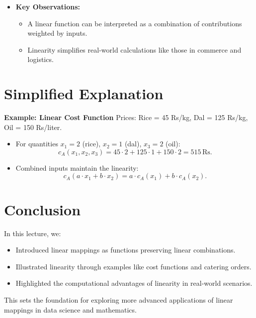 \documentclass{article}
\begin{document}
\begin{itemize}
  \item \textbf{Key Observations:}
    \begin{itemize}
      \item A linear function can be interpreted as a combination of contributions weighted by inputs.
      \item Linearity simplifies real-world calculations like those in commerce and logistics.
    \end{itemize}
\end{itemize}

\section*{Simplified Explanation}

\textbf{Example: Linear Cost Function}
Prices: Rice = 45 Rs/kg, Dal = 125 Rs/kg, Oil = 150 Rs/liter.
\begin{itemize}
  \item For quantities $x_1 = 2$ (rice), $x_2 = 1$ (dal), $x_3 = 2$ (oil):
    \[
      c_A(x_1, x_2, x_3) = 45 \cdot 2 + 125 \cdot 1 + 150 \cdot 2 = 515 \, \text{Rs}.
    \]
  \item Combined inputs maintain the linearity:
    \[
      c_A\left(a \cdot x_1 + b \cdot x_2\right) = a \cdot c_A(x_1) + b \cdot c_A(x_2).
    \]
\end{itemize}

\section*{Conclusion}

In this lecture, we:
\begin{itemize}
  \item Introduced linear mappings as functions preserving linear combinations.
  \item Illustrated linearity through examples like cost functions and catering orders.
  \item Highlighted the computational advantages of linearity in real-world scenarios.
\end{itemize}

This sets the foundation for exploring more advanced applications of linear mappings in data science and mathematics.
\end{document}
